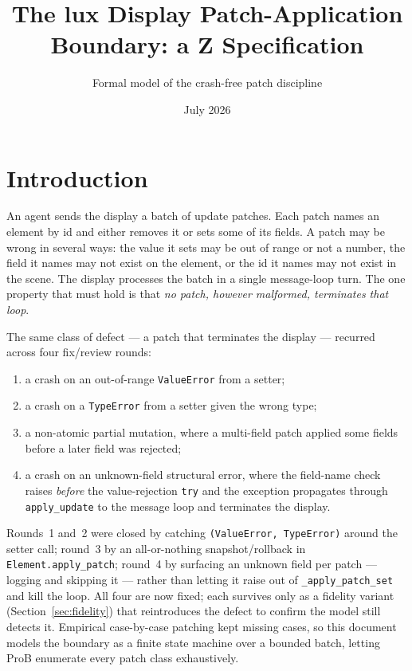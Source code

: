 \documentclass[a4paper,10pt,fleqn]{article}
\begin{document}
\title{The lux Display Patch-Application Boundary: a Z Specification}
\author{Formal model of the crash-free patch discipline}
\date{July 2026}
\maketitle

\section{Introduction}

An agent sends the display a batch of update patches.  Each patch names an
element by id and either removes it or sets some of its fields.  A patch may
be wrong in several ways: the value it sets may be out of range or not a
number, the field it names may not exist on the element, or the id it names
may not exist in the scene.  The display processes the batch in a single
message-loop turn.  The one property that must hold is that \emph{no patch,
however malformed, terminates that loop}.

The same class of defect --- a patch that terminates the display ---
recurred across four fix/review rounds:

\begin{enumerate}
  \item a crash on an out-of-range \texttt{ValueError} from a setter;
  \item a crash on a \texttt{TypeError} from a setter given the wrong type;
  \item a non-atomic partial mutation, where a multi-field patch applied
    some fields before a later field was rejected;
  \item a crash on an unknown-field structural error, where the field-name
    check raises \emph{before} the value-rejection \texttt{try} and the
    exception propagates through \texttt{apply\_update} to the message
    loop and terminates the display.
\end{enumerate}

Rounds~1 and~2 were closed by catching \texttt{(ValueError, TypeError)}
around the setter call; round~3 by an all-or-nothing snapshot/rollback in
\texttt{Element.apply\_patch}; round~4 by surfacing an unknown field per
patch --- logging and skipping it --- rather than letting it raise out of
\texttt{\_apply\_patch\_set} and kill the loop.  All four are now fixed;
each survives only as a fidelity variant (Section~\ref{sec:fidelity}) that
reintroduces the defect to confirm the model still detects it.  Empirical
case-by-case patching kept missing cases, so this document models the
boundary as a finite state machine over a bounded batch, letting ProB
enumerate every patch class exhaustively.
\end{document}
